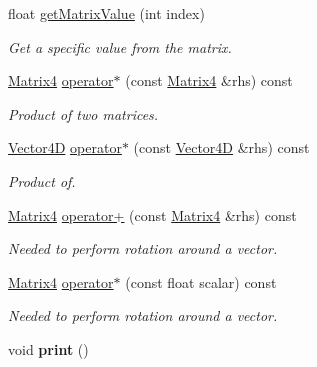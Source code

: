 \begin{DoxyCompactItemize}
float \mbox{\hyperlink{class_matrix4_a4733d9680ee4de7f9df3b83ab41b1767}{get\+Matrix\+Value}} (int index)
\begin{DoxyCompactList}\small\item\em Get a specific value from the matrix. \end{DoxyCompactList}\item 
\mbox{\label{class_matrix4_ace5fb62ba207d9b1ac7ab7a366957f60}} 
\mbox{\hyperlink{class_matrix4}{Matrix4}} \mbox{\hyperlink{class_matrix4_ace5fb62ba207d9b1ac7ab7a366957f60}{operator$\ast$}} (const \mbox{\hyperlink{class_matrix4}{Matrix4}} \&rhs) const
\begin{DoxyCompactList}\small\item\em Product of two matrices. \end{DoxyCompactList}\item 
\mbox{\label{class_matrix4_afec465e9fdefc5d69062efbbe5f5446a}} 
\mbox{\hyperlink{class_vector4_d}{Vector4D}} \mbox{\hyperlink{class_matrix4_afec465e9fdefc5d69062efbbe5f5446a}{operator$\ast$}} (const \mbox{\hyperlink{class_vector4_d}{Vector4D}} \&rhs) const
\begin{DoxyCompactList}\small\item\em Product of. \end{DoxyCompactList}\item 
\mbox{\label{class_matrix4_a61b8f5a2f89ae56c43b91e750ae6e580}} 
\mbox{\hyperlink{class_matrix4}{Matrix4}} \mbox{\hyperlink{class_matrix4_a61b8f5a2f89ae56c43b91e750ae6e580}{operator+}} (const \mbox{\hyperlink{class_matrix4}{Matrix4}} \&rhs) const
\begin{DoxyCompactList}\small\item\em Needed to perform rotation around a vector. \end{DoxyCompactList}\item 
\mbox{\label{class_matrix4_ad348ae172508538bc282895b964296f1}} 
\mbox{\hyperlink{class_matrix4}{Matrix4}} \mbox{\hyperlink{class_matrix4_ad348ae172508538bc282895b964296f1}{operator$\ast$}} (const float scalar) const
\begin{DoxyCompactList}\small\item\em Needed to perform rotation around a vector. \end{DoxyCompactList}\item 
\mbox{\label{class_matrix4_a4daa9a348759a3331fbad171c0712974}} 
void {\bfseries print} ()
\end{DoxyCompactItemize}
